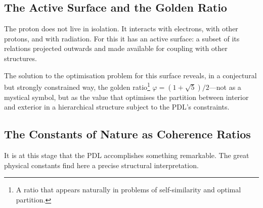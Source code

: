 \documentclass[12pt, a4paper, openright]{book}
\begin{document}
\subsection*{The Active Surface and the Golden Ratio}

The proton does not live in isolation. It interacts with electrons, with other protons, and with radiation. For this it has an active surface: a subset of its relations projected outwards and made available for coupling with other structures.

\medskip

The solution to the optimisation problem for this surface reveals, in a conjectural but strongly constrained way, the golden ratio\footnote{A ratio that appears naturally in problems of self-similarity and optimal partition.} $\varphi = (1+\sqrt{5})/2$---not as a mystical symbol, but as the value that optimises the partition between interior and exterior in a hierarchical structure subject to the PDL's constraints.

\subsection*{The Constants of Nature as Coherence Ratios}

It is at this stage that the PDL accomplishes something remarkable. The great physical constants find here a precise structural interpretation.

\medskip
\end{document}
